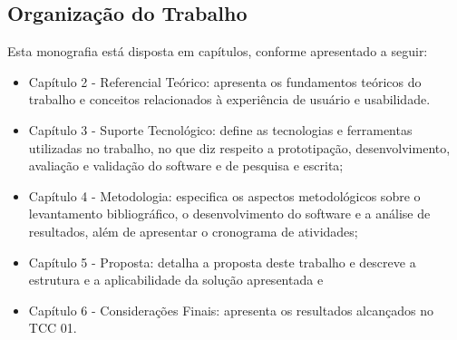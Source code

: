 \subsection{Organização do Trabalho}
\label{sec:OrganizacaodoTrabalho}

\begin{description}
    \item Esta monografia está disposta em capítulos, conforme apresentado a seguir:
          \begin{itemize}
              \item Capítulo 2 - Referencial Teórico: apresenta os fundamentos teóricos do trabalho e conceitos relacionados à experiência de usuário e usabilidade.

              \item Capítulo 3 - Suporte Tecnológico: define as tecnologias e ferramentas utilizadas no trabalho, no que diz respeito a prototipação, desenvolvimento,
                    avaliação e validação do software e de pesquisa e escrita;

              \item Capítulo 4 - Metodologia: especifica os aspectos metodológicos sobre o levantamento bibliográfico, o desenvolvimento do software e a análise de
              resultados, além de apresentar o cronograma de atividades;

              \item Capítulo 5 - Proposta: detalha a proposta deste trabalho e descreve a estrutura e a aplicabilidade da solução apresentada e

              \item Capítulo 6 - Considerações Finais: apresenta os resultados alcançados no TCC 01.
          \end{itemize}
\end{description}

